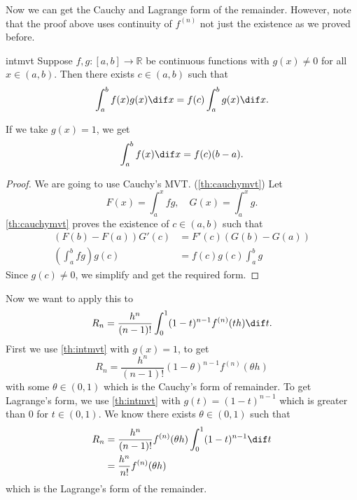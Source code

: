 Now we can get the Cauchy and Lagrange form of the remainder. However, note that the proof above uses continuity of \(f^{(n)}\) not just the existence as we proved before.
\begin{theorem}{}{intmvt}
    Suppose \(f,g: [a,b] \to \mathbb{R}\) be continuous functions with \(g(x)\neq 0\) for all \(x \in (a,b)\). Then there exists \(c \in (a,b)\) such that
    \[
        \int^b_a f(x)g(x)\dif x = f(c)\int^b_a g(x) \dif x.
    \]
\end{theorem}
\begin{note}
    If we take \(g(x) = 1\), we get
    \[
        \int^b_a f(x) \dif x = f(c) (b-a).
    \]
\end{note}
\begin{proof}
    We are going to use Cauchy's MVT. (\cref{th:cauchymvt}) Let
    \[
        F(x) = \int^x_a fg, \quad G(x) = \int^x_a g.
    \]
    \cref{th:cauchymvt} proves the existence of \(c \in (a,b)\) such that
    \begin{align*}
        (F(b) - F(a))G'(c) &= F'(c)(G(b) - G(a))\\
        (\int^b_a fg)g(c) &= f(c)g(c)\int^b_a g
    \end{align*}
    Since \(g(c) \neq 0\), we simplify and get the required form.
\end{proof}
Now we want to apply this to
\[
    R_n = \frac{h^n}{(n-1)!}\int^1_0 (1-t)^{n-1}f^{(n)}(th) \dif t.
\]
First we use \cref{th:intmvt} with \(g(x) = 1\), to get
\[
    R_n = \frac{h^n}{(n-1)!}(1-\theta)^{n-1}f^{(n)}(\theta
     h)
\]
with some \(\theta \in (0,1)\) which is the Cauchy's form of remainder. To get Lagrange's form, we use \cref{th:intmvt} with \(g(t) = (1-t)^{n-1}\) which is greater than 0 for \(t \in (0,1)\). We know there exists \(\theta \in (0,1)\) such that
\begin{align*}
    R_n&=\frac{h^n}{(n-1)!}f^{(n)}(\theta h)\int^1_0 (1-t)^{n-1}\dif t\\
    &= \frac{h^n}{n!}f^{(n)}(\theta h)
\end{align*}
which is the Lagrange's form of the remainder.